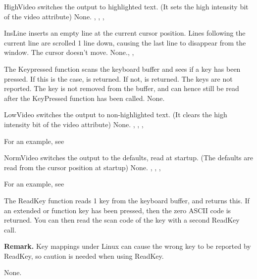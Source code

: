

{ HighVideo switches the output to highlighted text. (It sets the high
intensity bit of the video attribute)
}
{None.}{ , , ,
}



{ InsLine inserts an empty line at the current cursor position. 
Lines following the current line are scrolled 1 line down, 
causing the last line to disappear from the window. 
The cursor doesn't move.}
{None.}{, , }



{ The Keypressed function scans the keyboard buffer and sees if a key has
been pressed. If this is the case,  is returned. If not,
 is returned. The  keys are not reported.
The key is not removed from the buffer, and can hence still be read after
the KeyPressed function has been called.
}
{None.}{}



{ LowVideo switches the output to non-highlighted text. (It clears the high
intensity bit of the video attribute)
}
{None.}{ , , ,
}

For an example, see 

{ NormVideo switches the output to the defaults, read at startup. (The
defaults are read from the cursor position at startup)
}
{None.}{ , , ,
}

For an example, see 




{
The ReadKey function reads 1 key from the keyboard buffer, and returns this.
If an extended or function key has been pressed, then the zero ASCII code is 
returned. You can then read the scan code of the key with a second ReadKey
call.

\textbf{Remark.} Key mappings under Linux can cause the wrong key to be
reported by ReadKey, so caution is needed when using ReadKey.  
}
{None.}{}

